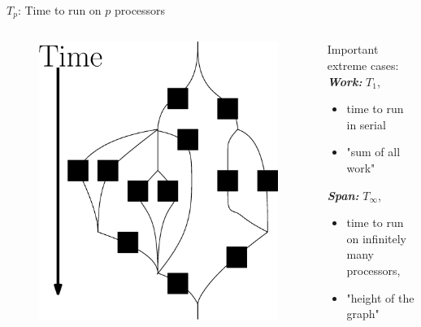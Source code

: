\documentclass[xcolor=x11names, svgnames, rgb]{beamer}
\newcommand{\defn}[1]       {{\textit{\textbf{\boldmath #1}}}}
\begin{document}
\begin{frame}[t]{\defn{$T_p$}: Time to run on $p$ processors}
	\begin{columns}[T] %
	\begin{column}{.60\textwidth}
		\begin{figure}
			\includegraphics[width=0.8\linewidth]{imgs/parallelForLoop/altParallelForLoopComposition.eps}
		\end{figure}
	\end{column}
	\hfill
	\begin{column}{.45\textwidth}
		Important extreme cases:\\
		\vspace{0.3cm}
		\defn{Work:} $T_1$, 
		\begin{itemize}
			\item time to run in serial
			\item "sum of all work"
		\end{itemize}
		\vspace{0.3cm}
		\defn{Span:} $T_\infty$,
		\begin{itemize}
			\item time to run on infinitely many processors,\\ 
			\item "height of the graph"
		\end{itemize}	
	\end{column}
	\end{columns}
\end{frame}
\end{document}

